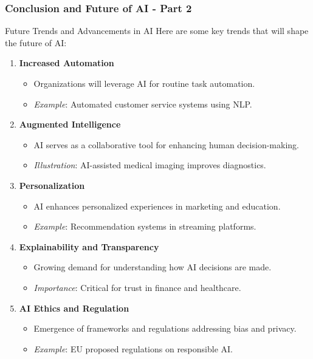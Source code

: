 \documentclass[aspectratio=169]{beamer}
\begin{document}
\begin{frame}[fragile]
    \frametitle{Conclusion and Future of AI - Part 2}
    \begin{block}{Future Trends and Advancements in AI}
        Here are some key trends that will shape the future of AI:
    \end{block}
    
    \begin{enumerate}
        \item \textbf{Increased Automation}
            \begin{itemize}
                \item Organizations will leverage AI for routine task automation.
                \item \textit{Example}: Automated customer service systems using NLP.
            \end{itemize}
        
        \item \textbf{Augmented Intelligence}
            \begin{itemize}
                \item AI serves as a collaborative tool for enhancing human decision-making.
                \item \textit{Illustration}: AI-assisted medical imaging improves diagnostics.
            \end{itemize}

        \item \textbf{Personalization}
            \begin{itemize}
                \item AI enhances personalized experiences in marketing and education.
                \item \textit{Example}: Recommendation systems in streaming platforms.
            \end{itemize}
        
        \item \textbf{Explainability and Transparency}
            \begin{itemize}
                \item Growing demand for understanding how AI decisions are made.
                \item \textit{Importance}: Critical for trust in finance and healthcare.
            \end{itemize}
        
        \item \textbf{AI Ethics and Regulation}
            \begin{itemize}
                \item Emergence of frameworks and regulations addressing bias and privacy.
                \item \textit{Example}: EU proposed regulations on responsible AI.
            \end{itemize}
    \end{enumerate}
\end{frame}
\end{document}
